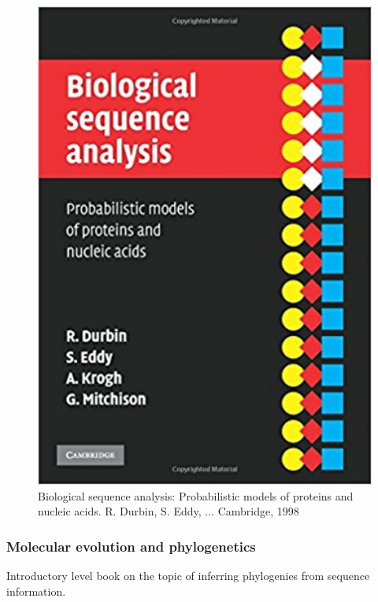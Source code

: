 \documentclass[]{book}
\theoremstyle{definition}
\theoremstyle{definition}
\theoremstyle{definition}
\theoremstyle{remark}
\begin{document}
\begin{figure}
\includegraphics[width=4.83in]{pic/hmm_book} \caption{Biological sequence analysis: Probabilistic models of proteins and nucleic acids. R. Durbin, S. Eddy, ... Cambridge, 1998}\label{fig:unnamed-chunk-11}
\end{figure}

\hypertarget{molecular-evolution-and-phylogenetics}{\subsubsection*{Molecular
evolution and
phylogenetics}\label{molecular-evolution-and-phylogenetics}}

Introductory level book on the topic of inferring phylogenies from
sequence information.
\end{document}
